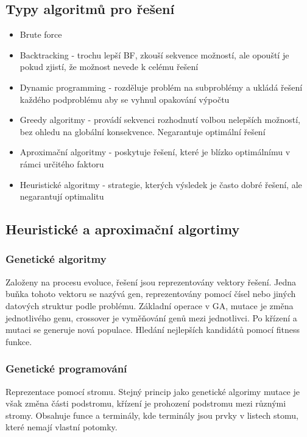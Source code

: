 \subsection{Typy algoritmů pro řešení}
\begin{itemize}
    \item Brute force
    \item Backtracking - trochu lepší BF, zkouší sekvence možností, ale opouští je pokud zjistí, že možnost nevede k celému řešení
    \item Dynamic programming - rozděluje problém na subproblémy a ukládá řešení každého podproblému aby se vyhnul opakování výpočtu
    \item Greedy algoritmy - provádí sekvenci rozhodnutí volbou nelepších možností, bez ohledu na globální konsekvence. Negarantuje optimální řešení
    \item Aproximační algoritmy - poskytuje řešení, které je blízko optimálnímu v rámci určitého faktoru
    \item Heuristické algoritmy - strategie, kterých výsledek je často dobré řešení, ale negarantují optimalitu
\end{itemize}


\subsection{Heuristické a aproximační algortimy}
\subsubsection{Genetické algoritmy}
Založeny na procesu evoluce, řešení jsou reprezentovány vektory řešení. Jedna buňka tohoto vektoru se nazývá gen, reprezentovány pomocí čísel nebo jiných datových
struktur podle problému. Základní operace v GA, mutace je změna jednotlivého genu, crossover je vyměňování genů mezi jednotlivci. Po křízení a mutaci se generuje
nová populace. Hledání nejlepších kandidátů pomocí fitness funkce.

\subsubsection{Genetické programování}
Reprezentace pomocí stromu. Stejný princip jako genetické algorimy mutace je však změna části podstromu, křízení je prohození podstromu mezi různými stromy. 
Obsahuje funce a terminály, kde terminály jsou prvky v listech stomu, které nemají vlastní potomky. 

